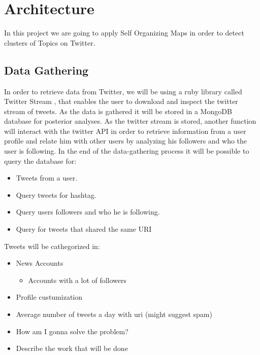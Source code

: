 
\section{Architecture} %
\label{sec:architecture}
In this project we are going to apply Self Organizing Maps in order to detect clusters of Topics on Twitter. 

\subsection{Data Gathering} %
 \label{sub:data_gathering}

 In order to retrieve data from Twitter, we will be using a ruby library called Twitter Stream \cite{TweetStream} , that enables the user to download and inspect the twitter stream of tweets. As the data is gathered it will be stored in a MongoDB database for posterior analyses. 
 As the twitter stream is stored, another function will interact with the twitter API in order to retrieve information from a user profile and relate him with other users by analyzing his followers and who the user is following.
 In the end of the data-gathering process it will be possible to query the database for:
 \begin{itemize}
   \item  Tweets from a user.
   \item  Query tweets for hashtag.
   \item  Query users followers and who he is following.
   \item  Query for tweets that shared the same URI 
 \end{itemize}

 Tweets will be cathegorized in:
 \begin{itemize}
   \item News Accounts
   \begin{itemize}
     \item Accounts with a lot of followers
   \end{itemize}
   \item Profile custumization 
   \item Average number of tweets a day with uri (might suggest spam)
 \end{itemize}


\begin{itemize}
  \item How am I gonna solve the problem? 
  \item Describe the work that will be done 
\end{itemize}
